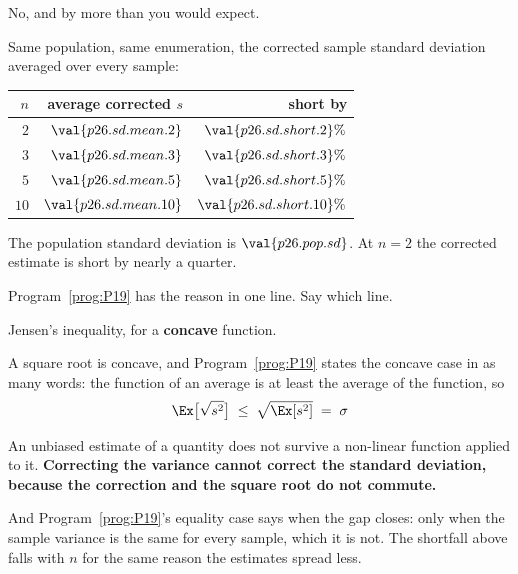 \begin{fr}
\begin{ansblock}
No, and by more than you would expect.
\end{ansblock}

Same population, same enumeration, the corrected sample standard deviation
averaged over every sample:

\begin{center}
\begin{tabular}{rrr}
\toprule
$n$ & average corrected $s$ & short by \\
\midrule
$2$ & $\val{p26.sd.mean.2}$ & $\val{p26.sd.short.2}\%$ \\
$3$ & $\val{p26.sd.mean.3}$ & $\val{p26.sd.short.3}\%$ \\
$5$ & $\val{p26.sd.mean.5}$ & $\val{p26.sd.short.5}\%$ \\
$10$ & $\val{p26.sd.mean.10}$ & $\val{p26.sd.short.10}\%$ \\
\bottomrule
\end{tabular}
\end{center}

The population standard deviation is $\val{p26.pop.sd}$. At $n = 2$ the
corrected estimate is short by nearly a quarter.

Program~\ref{prog:P19} has the reason in one line. Say which line.
\dotline
\nextframe
\end{fr}

\begin{fr}
\begin{ansblock}
Jensen's inequality, for a \textbf{concave} function.
\end{ansblock}

A square root is concave, and Program~\ref{prog:P19} states the concave case
in as many words: the function of an average is at least the average of the
function, so
\[ \Ex\bigl[\sqrt{s^{2}}\bigr] \;\le\; \sqrt{\Ex[s^{2}]} \;=\; \sigma \]

An unbiased estimate of a quantity does not survive a non-linear function
applied to it. \textbf{Correcting the variance cannot correct the standard
deviation, because the correction and the square root do not commute.}

And Program~\ref{prog:P19}'s equality case says when the gap closes: only
when the sample variance is the same for every sample, which it is not. The
shortfall above falls with $n$ for the same reason \dash{} the estimates
spread less.
\end{fr}


